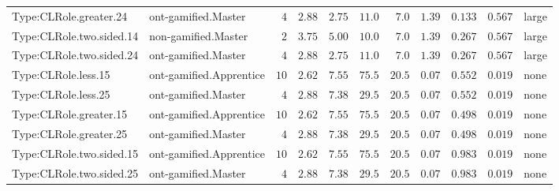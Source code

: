 \documentclass[6pt,a4paper]{article}
\begin{document}
{\begin{longtable}{llrrrrrrrrl}
Type:CLRole.greater.24&ont-gamified.Master&$ 4$&$2.88$&$ 2.75$&$ 11.0$&$ 7.0$&$1.39$&$0.133$&$0.567$&large\tabularnewline
Type:CLRole.two.sided.14&non-gamified.Master&$ 2$&$3.75$&$ 5.00$&$ 10.0$&$ 7.0$&$1.39$&$0.267$&$0.567$&large\tabularnewline
Type:CLRole.two.sided.24&ont-gamified.Master&$ 4$&$2.88$&$ 2.75$&$ 11.0$&$ 7.0$&$1.39$&$0.267$&$0.567$&large\tabularnewline
Type:CLRole.less.15&ont-gamified.Apprentice&$10$&$2.62$&$ 7.55$&$ 75.5$&$20.5$&$0.07$&$0.552$&$0.019$&none\tabularnewline
Type:CLRole.less.25&ont-gamified.Master&$ 4$&$2.88$&$ 7.38$&$ 29.5$&$20.5$&$0.07$&$0.552$&$0.019$&none\tabularnewline
Type:CLRole.greater.15&ont-gamified.Apprentice&$10$&$2.62$&$ 7.55$&$ 75.5$&$20.5$&$0.07$&$0.498$&$0.019$&none\tabularnewline
Type:CLRole.greater.25&ont-gamified.Master&$ 4$&$2.88$&$ 7.38$&$ 29.5$&$20.5$&$0.07$&$0.498$&$0.019$&none\tabularnewline
\newpage
Type:CLRole.two.sided.15&ont-gamified.Apprentice&$10$&$2.62$&$ 7.55$&$ 75.5$&$20.5$&$0.07$&$0.983$&$0.019$&none\tabularnewline
Type:CLRole.two.sided.25&ont-gamified.Master&$ 4$&$2.88$&$ 7.38$&$ 29.5$&$20.5$&$0.07$&$0.983$&$0.019$&none\tabularnewline
\hline
\end{longtable}}
\end{document}
